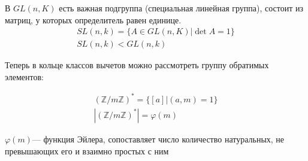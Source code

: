 В $GL(n, K)$ есть важная подгруппа (специальная линейная группа), состоит из матриц, у которых определитель равен единице. 
\begin{gather*}
  SL(n, k) = \{ A \in GL(n, K) | \det{A} = 1 \} \\
  SL(n, k) < GL(n, k)
\end{gather*}

Теперь в кольце классов вычетов можно рассмотреть группу обратимых элементов: 

\begin{gather*}
  (\mathbb{Z}/m \mathbb{Z})^* = \{ [a] | (a, m) = 1 \} \\
  |(\mathbb{Z}/m \mathbb{Z})^*| = \varphi(m)
\end{gather*}

$\varphi(m)$--- функция Эйлера, сопоставляет число количество натуральных, не превышающих его и взаимно простых с ним

